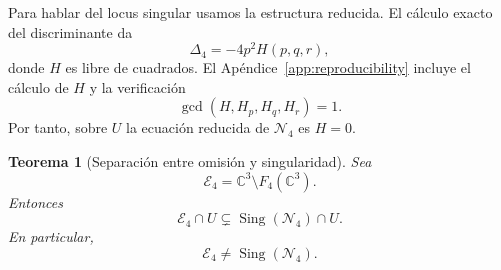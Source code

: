 \documentclass[11pt]{article}
\newtheorem{theorem}{Teorema}[section]
\theoremstyle{definition}
\theoremstyle{remark}
\newcommand{\C}{\mathbb{C}}
\newcommand{\Sing}{\operatorname{Sing}}
\begin{document}
Para hablar del locus singular usamos la estructura reducida. El c\'alculo
exacto del discriminante da
\begin{equation}\label{eq:quartic-discriminant-factor}
\Delta_4=-4p^2H(p,q,r),
\end{equation}
donde $H$ es libre de cuadrados. El Ap\'endice~\ref{app:reproducibility}
incluye el c\'alculo de $H$ y la verificaci\'on
\[
\gcd(H,H_p,H_q,H_r)=1.
\]
Por tanto, sobre $U$ la ecuaci\'on reducida de $\mathcal N_4$ es $H=0$.

\begin{theorem}[Separaci\'on entre omisi\'on y singularidad]
\label{thm:quartic-separation}
Sea
\[
\mathcal E_4=\C^3\setminus F_4(\C^3).
\]
Entonces
\begin{equation}\label{eq:quartic-strict-inclusion}
\mathcal E_4\cap U
\subsetneq
\Sing(\mathcal N_4)\cap U.
\end{equation}
En particular,
\[
\mathcal E_4\neq\Sing(\mathcal N_4).
\]
\end{theorem}
\end{document}
